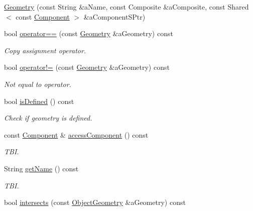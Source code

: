 \begin{DoxyCompactItemize}
\item 
\hyperlink{classostk_1_1simulation_1_1component_1_1_geometry_a8a5e6c898e651ac1e113d6e916f0583e}{Geometry} (const String \&a\+Name, const Composite \&a\+Composite, const Shared$<$ const \hyperlink{classostk_1_1simulation_1_1_component}{Component} $>$ \&a\+Component\+S\+Ptr)
\item 
bool \hyperlink{classostk_1_1simulation_1_1component_1_1_geometry_a1ec1b13d99e4c8df7f601f9f1ccb5458}{operator==} (const \hyperlink{classostk_1_1simulation_1_1component_1_1_geometry}{Geometry} \&a\+Geometry) const
\begin{DoxyCompactList}\small\item\em Copy assignment operator. \end{DoxyCompactList}\item 
bool \hyperlink{classostk_1_1simulation_1_1component_1_1_geometry_adf01650ac1c43b91e91ae364f79000b2}{operator!=} (const \hyperlink{classostk_1_1simulation_1_1component_1_1_geometry}{Geometry} \&a\+Geometry) const
\begin{DoxyCompactList}\small\item\em Not equal to operator. \end{DoxyCompactList}\item 
bool \hyperlink{classostk_1_1simulation_1_1component_1_1_geometry_a74a72f8e07513ba52a41a006c2e7687c}{is\+Defined} () const
\begin{DoxyCompactList}\small\item\em Check if geometry is defined. \end{DoxyCompactList}\item 
const \hyperlink{classostk_1_1simulation_1_1_component}{Component} \& \hyperlink{classostk_1_1simulation_1_1component_1_1_geometry_aaf42fdfd3bccb180db7efe9db8eeaf4b}{access\+Component} () const
\begin{DoxyCompactList}\small\item\em T\+BI. \end{DoxyCompactList}\item 
String \hyperlink{classostk_1_1simulation_1_1component_1_1_geometry_a2f13ab1988d7d64407f63100fd547fd0}{get\+Name} () const
\begin{DoxyCompactList}\small\item\em T\+BI. \end{DoxyCompactList}\item 
bool \hyperlink{classostk_1_1simulation_1_1component_1_1_geometry_aeec7b3694e1ca2552b65c56de9acc315}{intersects} (const \hyperlink{namespaceostk_1_1simulation_1_1component_a911837ab7e6f8471e9927a74795a0077}{Object\+Geometry} \&a\+Geometry) const

\end{DoxyCompactItemize}
